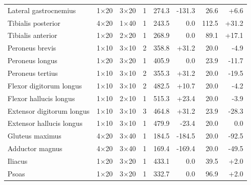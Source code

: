 \documentclass[utf8]{frontiers_suppmat} %
\begin{document}
\begin{table}[htbp]
\begin{tabular}{@{}lrrrrrrr@{}}
Lateral gastrocnemius & 1$\times$20 & 3$\times$20 & 1 & 274.3 & -131.3 & 26.6 & +6.6 \\
Tibialis posterior & 4$\times$20 & 1$\times$40 & 1 & 243.5 & 0.0 & 112.5 & +31.2 \\
Tibialis anterior & 1$\times$20 & 2$\times$20 & 1 & 268.9 & 0.0 & 89.1 & +17.1 \\
Peroneus brevis & 1$\times$10 & 3$\times$10 & 2 & 358.8 & +31.2 & 20.0 & -4.9 \\
Peroneus longus & 1$\times$20 & 3$\times$20 & 1 & 405.9 & 0.0 & 23.9 & -11.7 \\
Peroneus tertius & 1$\times$10 & 3$\times$10 & 2 & 355.3 & +31.2 & 20.0 & -19.5 \\
Flexor digitorum longus & 1$\times$10 & 3$\times$10 & 2 & 482.5 & +10.7 & 20.0 & -4.2 \\
Flexor hallucis longus & 1$\times$10 & 2$\times$10 & 1 & 515.3 & +23.4 & 20.0 & -3.9 \\
Extensor digitorum longus & 1$\times$10 & 3$\times$10 & 3 & 464.8 & +31.2 & 23.9 & -28.3 \\
Extensor hallucis longus & 1$\times$10 & 3$\times$10 & 1 & 479.9 & -23.4 & 20.0 & 0.0 \\
Gluteus maximus & 4$\times$20 & 3$\times$40 & 1 & 184.5 & -184.5 & 20.0 & -92.5 \\
Adductor magnus & 4$\times$20 & 3$\times$40 & 1 & 169.4 & -169.4 & 20.0 & -49.5 \\
Iliacus & 1$\times$20 & 3$\times$20 & 1 & 433.1 & 0.0 & 39.5 & +2.0 \\
Psoas & 1$\times$20 & 3$\times$20 & 1 & 332.7 & 0.0 & 96.9 & +2.0 \\
\bottomrule
\end{tabular}
\endgroup
\end{table}

\clearpage
\end{document}
